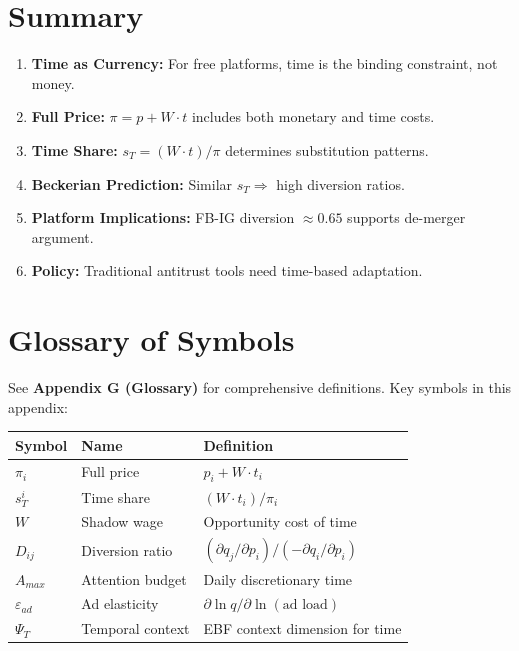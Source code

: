 
\section{Summary}
\label{sec:pt-summary}

\begin{tcolorbox}[colback=gray!10!white, colframe=gray!75!black,
    title=Key Takeaways]
\begin{enumerate}
\item \textbf{Time as Currency:} For free platforms, time is the binding constraint, not money.
\item \textbf{Full Price:} $\pi = p + W \cdot t$ includes both monetary and time costs.
\item \textbf{Time Share:} $s_T = (W \cdot t)/\pi$ determines substitution patterns.
\item \textbf{Beckerian Prediction:} Similar $s_T \Rightarrow$ high diversion ratios.
\item \textbf{Platform Implications:} FB-IG diversion $\approx 0.65$ supports de-merger argument.
\item \textbf{Policy:} Traditional antitrust tools need time-based adaptation.
\end{enumerate}
\end{tcolorbox}

\section{Glossary of Symbols}
\label{sec:pt-glossary}

See \textbf{Appendix G (Glossary)} for comprehensive definitions. Key symbols in this appendix:

\begin{center}
\begin{tabular}{lll}
\toprule
Symbol & Name & Definition \\
\midrule
$\pi_i$ & Full price & $p_i + W \cdot t_i$ \\
$s_T^i$ & Time share & $(W \cdot t_i) / \pi_i$ \\
$W$ & Shadow wage & Opportunity cost of time \\
$D_{ij}$ & Diversion ratio & $(\partial q_j/\partial p_i) / (-\partial q_i/\partial p_i)$ \\
$A_{max}$ & Attention budget & Daily discretionary time \\
$\varepsilon_{ad}$ & Ad elasticity & $\partial \ln q / \partial \ln (\text{ad load})$ \\
$\Psi_T$ & Temporal context & EBF context dimension for time \\
\bottomrule
\end{tabular}
\end{center}

